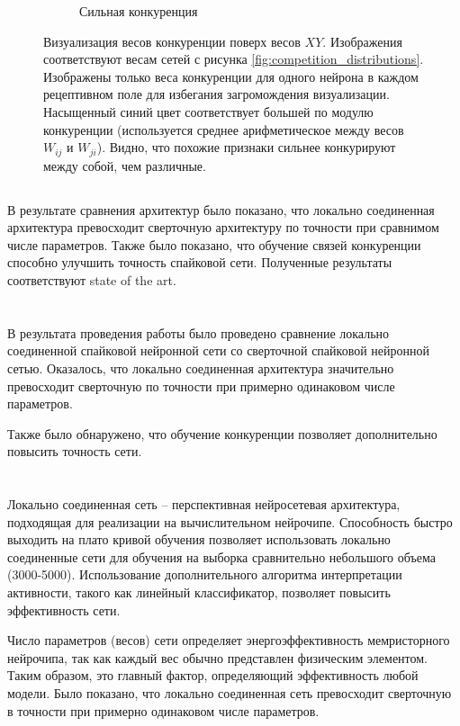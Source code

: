 \documentclass[a4paper]{article}
\begin{document}
\begin{figure}[H]
\begin{subfigure}{0.45\textwidth}
    \caption{Сильная конкуренция}
\end{subfigure} 
\caption{Визуализация весов конкуренции поверх весов $XY$. Изображения соответствуют весам сетей с рисунка \ref{fig:competition_distributions}. Изображены только веса конкуренции для одного нейрона в каждом рецептивном поле для избегания загромождения визуализации. Насыщенный синий цвет соответствует большей по модулю конкуренции (используется среднее арифметическое между весов $W_{ij}$ и $W_{ji}$). Видно, что похожие признаки сильнее конкурируют между собой, чем различные.}
\end{figure}

\subsection{}
В результате сравнения архитектур было показано, что локально соединенная архитектура превосходит
сверточную архитектуру по точности при сравнимом числе параметров. Также было показано, что обучение связей конкуренции способно улучшить точность спайковой сети. Полученные результаты соответствуют state of the art.

\pagebreak

\section{}
В результата проведения работы было проведено сравнение локально соединенной спайковой нейронной сети со сверточной спайковой нейронной сетью. Оказалось, что локально соединенная архитектура значительно превосходит сверточную по точности при примерно одинаковом числе параметров.

Также было обнаружено, что обучение конкуренции позволяет дополнительно повысить точность сети.

\section{}
Локально соединенная сеть – перспективная нейросетевая архитектура, подходящая для реализации на вычислительном нейрочипе. Способность быстро выходить на плато кривой обучения позволяет использовать локально соединенные сети для обучения на выборка сравнительно небольшого объема (3000-5000). Использование дополнительного алгоритма интерпретации активности, такого как линейный классификатор, позволяет повысить эффективность сети.

Число параметров (весов) сети определяет энергоэффективность мемристорного нейрочипа, так как каждый вес обычно представлен физическим элементом. Таким образом, это главный фактор, определяющий эффективность любой модели. Было показано, что локально соединенная сеть превосходит сверточную в точности при примерно одинаковом числе параметров.
\end{document}
